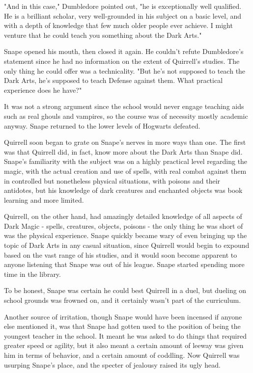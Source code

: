 "And in this case," Dumbledore pointed out, "he is exceptionally well qualified. He is a brilliant scholar, very well-grounded in his subject on a basic level, and with a depth of knowledge that few much older people ever achieve. I might venture that he could teach you something about the Dark Arts."

Snape opened his mouth, then closed it again. He couldn't refute Dumbledore's statement since he had no information on the extent of Quirrell's studies. The only thing he could offer was a technicality. "But he's not supposed to teach the Dark Arts, he's supposed to teach Defense against them. What practical experience does he have?"

It was not a strong argument since the school would never engage teaching aids such as real ghouls and vampires, so the course was of necessity mostly academic anyway. Snape returned to the lower levels of Hogwarts defeated.

Quirrell soon began to grate on Snape's nerves in more ways than one. The first was that Quirrell did, in fact, know more about the Dark Arts than Snape did. Snape's familiarity with the subject was on a highly practical level regarding the magic, with the actual creation and use of spells, with real combat against them in controlled but nonetheless physical situations, with poisons and their antidotes, but his knowledge of dark creatures and enchanted objects was book learning and more limited.

Quirrell, on the other hand, had amazingly detailed knowledge of all aspects of Dark Magic - spells, creatures, objects, poisons - the only thing he was short of was the physical experience. Snape quickly became wary of even bringing up the topic of Dark Arts in any casual situation, since Quirrell would begin to expound based on the vast range of his studies, and it would soon become apparent to anyone listening that Snape was out of his league. Snape started spending more time in the library.

To be honest, Snape was certain he could best Quirrell in a duel, but dueling on school grounds was frowned on, and it certainly wasn't part of the curriculum.

Another source of irritation, though Snape would have been incensed if anyone else mentioned it, was that Snape had gotten used to the position of being the youngest teacher in the school. It meant he was asked to do things that required greater speed or agility, but it also meant a certain amount of leeway was given him in terms of behavior, and a certain amount of coddling. Now Quirrell was usurping Snape's place, and the specter of jealousy raised its ugly head.

